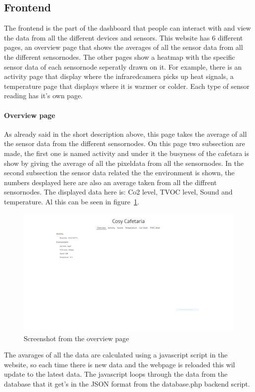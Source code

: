 \documentclass[11pt,a4paper]{article}
\begin{document}
\subsection{Frontend}
The frontend is the part of the dashboard that people can interact with and view the data from all the different devices and sensors.
This website has 6 different pages, an overview page that shows the averages of all the sensor data from all the different sensornodes.
The other pages show a heatmap with the specific sensor data of each sensornode seperatly drawn on it. 
For example, there is an activity page that display where the infraredcamera picks up heat signals, a temperature page that displays where it is warmer or colder.
Each type of sensor reading has it's own page.

\paragraph{Overview page}
As already said in the short description above, this page takes the average of all the sensor data from the different sensornodes. 
On this page two subsection are made, the first one is named activity and under it the busyness of the cafetara is show by giving the average of all the pixeldata from all the sensornodes.
In the second subsection the sensor data related the the environment is shown, the numbers desplayed here are also an average taken from all the diffrent sensornodes. 
The displayed data here is: Co2 level, TVOC level, Sound and temperature. Al this can be seen in figure~\ref{fig:overview_page}. 
\begin{figure}[H]
	\centering
	\includegraphics[width=1.0\linewidth]{overviewPage.png}
	\caption{Screenshot from the overview page}
	\label{fig:overview_page}
\end{figure}
The avarages of all the data are calculated using a javascript script in the website, so each time there is new data and the webpage is reloaded this wil update to the latest data.
The javascript loops through the data from the database that it get's in the JSON format from the database.php backend script.
\end{document}
